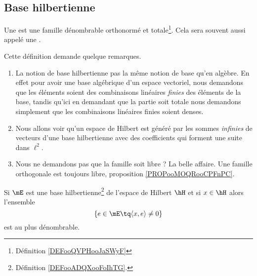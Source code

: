 \subsection{Base hilbertienne}

\begin{definition}      \label{DEFooADQXooFoIhTG}
    Une  est une famille dénombrable orthonormé et totale\footnote{Définition \ref{DEFooQVPHooJaSWyF}}. Cela sera souvent aussi appelé une .
\end{definition}

\begin{normaltext}
    Cette définition demande quelque remarques.

    \begin{enumerate}
        \item
            La notion de base hilbertienne pas la même notion de base qu'en algèbre. En effet pour avoir une base algébrique d'un espace vectoriel, nous demandons que les éléments soient des combinaisons linéaires \emph{finies} des éléments de la base, tandis qu'ici en demandant que la partie soit totale nous demandons simplement que les combinaisons linéaires finies soient denses.
        \item
            Nous allons voir qu'un espace de Hilbert est généré par les sommes \emph{infinies} de vecteurs d'une base hilbertienne avec des coefficients qui forment une suite dans \( \ell^2\).
        \item
            Nous ne demandons pas que la famille soit libre ? La belle affaire. Une famille orthogonale est toujours libre, proposition \ref{PROPooMOQRooCPFnPC}.
    \end{enumerate}
\end{normaltext}

\begin{lemma}       \label{LEMooHWOBooQJKdTD}
    Si \( \mE\) est une base hilbertienne\footnote{Définition \ref{DEFooADQXooFoIhTG}.} de l'espace de Hilbert \( \hH\) et si \( x\in \hH\) alors l'ensemble
    \begin{equation}
        \{ e\in\mE\tq \langle x, e\rangle \neq 0 \}
    \end{equation}
    est au plus dénombrable.
\end{lemma}

